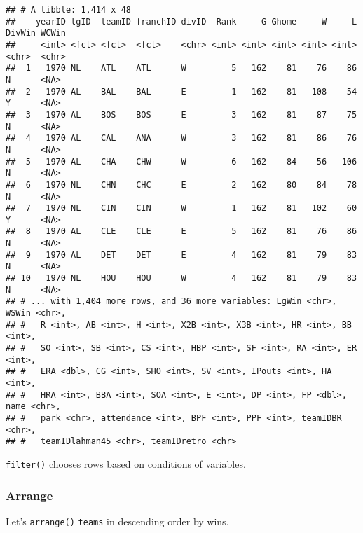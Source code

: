 \documentclass[
]{article}
\newenvironment{Shaded}{\begin{snugshade}}{\end{snugshade}}
\newcommand{\KeywordTok}[1]{\textcolor[rgb]{0.13,0.29,0.53}{\textbf{#1}}}
\newcommand{\NormalTok}[1]{#1}
\newcommand{\OperatorTok}[1]{\textcolor[rgb]{0.81,0.36,0.00}{\textbf{#1}}}
\newcommand{\StringTok}[1]{\textcolor[rgb]{0.31,0.60,0.02}{#1}}
\begin{document}
\begin{verbatim}
## # A tibble: 1,414 x 48
##    yearID lgID  teamID franchID divID  Rank     G Ghome     W     L DivWin WCWin
##     <int> <fct> <fct>  <fct>    <chr> <int> <int> <int> <int> <int> <chr>  <chr>
##  1   1970 NL    ATL    ATL      W         5   162    81    76    86 N      <NA> 
##  2   1970 AL    BAL    BAL      E         1   162    81   108    54 Y      <NA> 
##  3   1970 AL    BOS    BOS      E         3   162    81    87    75 N      <NA> 
##  4   1970 AL    CAL    ANA      W         3   162    81    86    76 N      <NA> 
##  5   1970 AL    CHA    CHW      W         6   162    84    56   106 N      <NA> 
##  6   1970 NL    CHN    CHC      E         2   162    80    84    78 N      <NA> 
##  7   1970 NL    CIN    CIN      W         1   162    81   102    60 Y      <NA> 
##  8   1970 AL    CLE    CLE      E         5   162    81    76    86 N      <NA> 
##  9   1970 AL    DET    DET      E         4   162    81    79    83 N      <NA> 
## 10   1970 NL    HOU    HOU      W         4   162    81    79    83 N      <NA> 
## # ... with 1,404 more rows, and 36 more variables: LgWin <chr>, WSWin <chr>,
## #   R <int>, AB <int>, H <int>, X2B <int>, X3B <int>, HR <int>, BB <int>,
## #   SO <int>, SB <int>, CS <int>, HBP <int>, SF <int>, RA <int>, ER <int>,
## #   ERA <dbl>, CG <int>, SHO <int>, SV <int>, IPouts <int>, HA <int>,
## #   HRA <int>, BBA <int>, SOA <int>, E <int>, DP <int>, FP <dbl>, name <chr>,
## #   park <chr>, attendance <int>, BPF <int>, PPF <int>, teamIDBR <chr>,
## #   teamIDlahman45 <chr>, teamIDretro <chr>
\end{verbatim}

\texttt{filter()} chooses rows based on conditions of variables.

\hypertarget{arrange}{%
\subsubsection{Arrange}\label{arrange}}

Let's \texttt{arrange()} \texttt{teams} in descending order by wins.

\begin{Shaded}
\end{Shaded}
\end{document}
